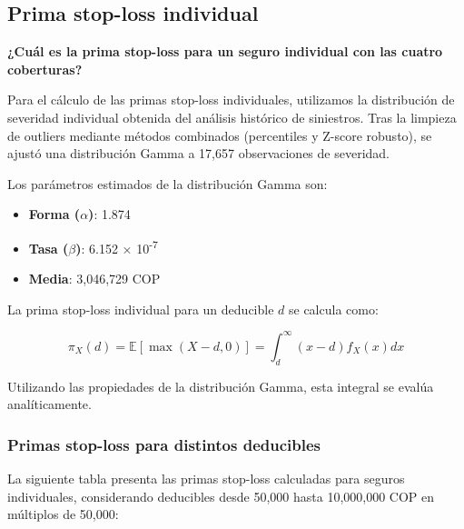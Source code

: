 \subsection{Prima stop-loss individual}

\textbf{¿Cuál es la prima stop-loss para un seguro individual con las cuatro coberturas?}

Para el cálculo de las primas stop-loss individuales, utilizamos la distribución de severidad individual obtenida del análisis histórico de siniestros. Tras la limpieza de outliers mediante métodos combinados (percentiles y Z-score robusto), se ajustó una distribución Gamma a 17,657 observaciones de severidad.

Los parámetros estimados de la distribución Gamma son:
\begin{itemize}
\item \textbf{Forma ($\alpha$)}: 1.874
\item \textbf{Tasa ($\beta$)}: 6.152 × 10\textsuperscript{-7}
\item \textbf{Media}: 3,046,729 COP
\end{itemize}

La prima stop-loss individual para un deducible $d$ se calcula como:

$$\pi_X(d) = \mathbb{E}[\max(X - d, 0)] = \int_d^{\infty} (x - d) f_X(x) dx$$

Utilizando las propiedades de la distribución Gamma, esta integral se evalúa analíticamente.

\subsubsection{Primas stop-loss para distintos deducibles}

La siguiente tabla presenta las primas stop-loss calculadas para seguros individuales, considerando deducibles desde 50,000 hasta 10,000,000 COP en múltiplos de 50,000:

